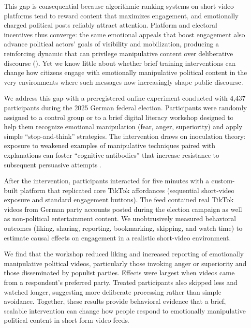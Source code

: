 \documentclass[12pt]{article}
\begin{document}
This gap is consequential because algorithmic ranking systems on short-video platforms tend to reward content that maximizes engagement, and emotionally charged political posts reliably attract attention. Platform and electoral incentives thus converge: the same emotional appeals that boost engagement also advance political actors’ goals of visibility and mobilization, producing a reinforcing dynamic that can privilege manipulative content over deliberative discourse (). Yet we know little about whether brief training interventions can change how citizens engage with emotionally manipulative political content in the very environments where such messages now increasingly shape public discourse.

We address this gap with a preregistered online experiment conducted with 4,437 participants during the 2025 German federal election. Participants were randomly assigned to a control group or to a brief digital literacy workshop designed to help them recognize emotional manipulation (fear, anger, superiority) and apply simple “stop-and-think” strategies. The intervention draws on inoculation theory: exposure to weakened examples of manipulative techniques paired with explanations can foster “cognitive antibodies” that increase resistance to subsequent persuasive attempts \cite{mcguire1961resistance,amazeen_science}.

After the intervention, participants interacted for five minutes with a custom-built platform that replicated core TikTok affordances (sequential short-video exposure and standard engagement buttons). The feed contained real TikTok videos from German party accounts posted during the election campaign as well as non-political entertainment content. We unobtrusively measured behavioral outcomes (liking, sharing, reporting, bookmarking, skipping, and watch time) to estimate causal effects on engagement in a realistic short-video environment.

We find that the workshop reduced liking and increased reporting of emotionally manipulative political videos, particularly those invoking anger or superiority and those disseminated by populist parties. Effects were largest when videos came from a respondent’s preferred party. Treated participants also skipped less and watched longer, suggesting more deliberate processing rather than simple avoidance. Together, these results provide behavioral evidence that a brief, scalable intervention can change how people respond to emotionally manipulative political content in short-form video feeds.
\end{document}
